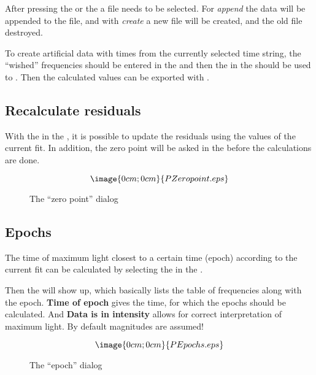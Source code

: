 After pressing the  or the 
a file needs to be selected. For {\it append} the data will be appended
to the file, and with {\it create} a new file will be created, and 
the old file destroyed.


To create artificial data with times from the currently selected time string,
the ``wished'' frequencies should be entered in the 
 and then the 
 in the  should be used to 
.
Then the calculated values can be exported with 
.

\subsection{Recalculate residuals}%
\label{period.recalculate}
With the  in the , it is 
possible to update the residuals using the values of the current fit.
In addition, the zero point will be asked in the
before the calculations are done.
\begin{figure}[h]
$$\image{0cm;0cm}{PZeropoint.eps}$$%
\caption{The ``zero point'' dialog}%
\label{period.residuals.dialog}
\end{figure}

\subsection{Epochs}%
\label{period.epochs}
The time of maximum light closest to a certain time (epoch) according 
to the current fit can be calculated by selecting the
 in the .

Then the  will show up,
which basically lists the table of frequencies along with the epoch.
{\bf Time of epoch} gives the time, for which the epochs should be calculated.
And {\bf Data is in intensity} allows for correct interpretation of 
maximum light. By default magnitudes are assumed!

\begin{figure}[h]
$$\image{0cm;0cm}{PEpochs.eps}$$%
\caption{The ``epoch'' dialog}%
\label{period.epochs.dialog}
\end{figure}

